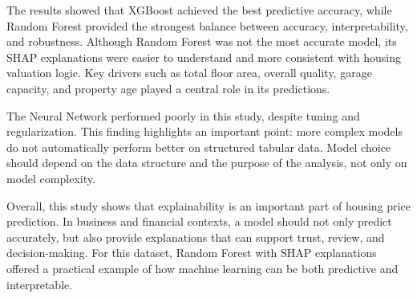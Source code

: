 \documentclass[12pt,a4paper,oneside,openany]{book}
\begin{document}
The results showed that XGBoost achieved the best predictive accuracy, while Random Forest provided the strongest balance between accuracy, interpretability, and robustness. Although Random Forest was not the most accurate model, its SHAP explanations were easier to understand and more consistent with housing valuation logic. Key drivers such as total floor area, overall quality, garage capacity, and property age played a central role in its predictions.

The Neural Network performed poorly in this study, despite tuning and regularization. This finding highlights an important point: more complex models do not automatically perform better on structured tabular data. Model choice should depend on the data structure and the purpose of the analysis, not only on model complexity.

Overall, this study shows that explainability is an important part of housing price prediction. In business and financial contexts, a model should not only predict accurately, but also provide explanations that can support trust, review, and decision-making. For this dataset, Random Forest with SHAP explanations offered a practical example of how machine learning can be both predictive and interpretable.
\end{document}
